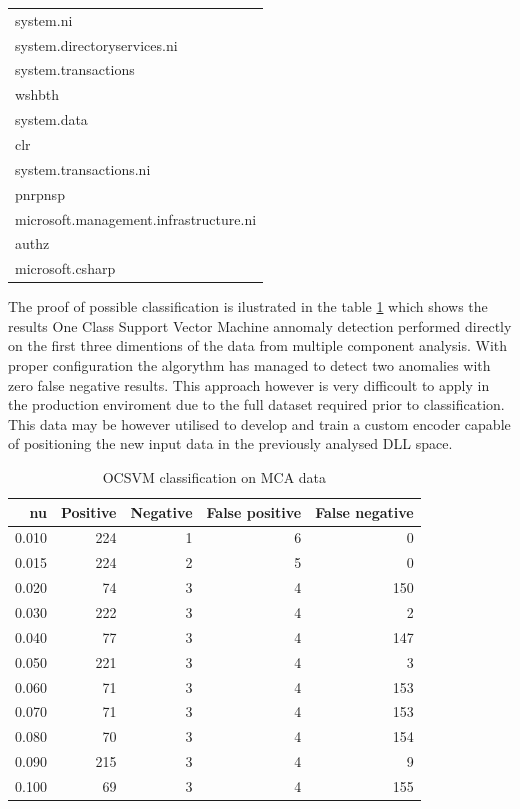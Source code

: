 \documentclass[a4paper,twoside,12pt]{book}
\begin{document}
\begin{table}
\begin{tabular}{l}
									   system.ni \\
					 system.directoryservices.ni \\
							 system.transactions \\
										  wshbth \\
									 system.data \\
											 clr \\
						  system.transactions.ni \\
										 pnrpnsp \\
		  microsoft.management.infrastructure.ni \\
										   authz \\
								microsoft.csharp \\
	\bottomrule
\end{tabular}
\end{table}

The proof of possible classification is ilustrated in the table \ref{id:tab:OCSVMonMCA} which shows the 
results One Class Support Vector Machine annomaly detection performed directly on the first three dimentions 
of the data from multiple component analysis. With proper configuration the algorythm has managed to detect 
two anomalies with zero false negative results. This approach however is very difficoult to apply in the 
production enviroment due to the full dataset required prior to classification. This data may be however 
utilised to develop and train a custom encoder capable of positioning the new input data in the previously 
analysed DLL space.  


\begin{table}
	\centering
	\caption{OCSVM classification on MCA data}
	\label{id:tab:OCSVMonMCA}
\begin{tabular}{rrrrr}
	\toprule
		nu &  Positive &  Negative &  False positive &  False negative \\
	\midrule
	 0.010 &       224 &         1 &               6 &               0 \\
	 0.015 &       224 &         2 &               5 &               0 \\
	 0.020 &        74 &         3 &               4 &             150 \\
	 0.030 &       222 &         3 &               4 &               2 \\
	 0.040 &        77 &         3 &               4 &             147 \\
	 0.050 &       221 &         3 &               4 &               3 \\
	 0.060 &        71 &         3 &               4 &             153 \\
	 0.070 &        71 &         3 &               4 &             153 \\
	 0.080 &        70 &         3 &               4 &             154 \\
	 0.090 &       215 &         3 &               4 &               9 \\
	 0.100 &        69 &         3 &               4 &             155 \\
	\bottomrule
\end{tabular}
\end{table} 
\end{document}
